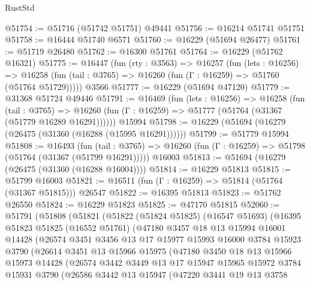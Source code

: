 \begin{lexlean}{RustStd}
\begin{coremodule}
@51754 := @51716 (@51742 @51751) @49441
@51756 := @16214 @51741 @51751
@51758 := @16444 @51740 @6571
@51760 := @16229 (@51694 @26477)
@51761 := @51719 @26480
@51762 := @16300 @51761
@51764 := @16229 (@51762 @16321)
@51775 := @16447
    (fun (rty : @3563) =>
    @16257
      (fun (lets : @16256) =>
      @16258 (fun (tail : @3765) => @16260 (fun (Γ : @16259) => @51760 (@51764 @51729)))))
    @3566
@51777 := @16229 (@51694 @47120)
@51779 := @31368 @51724 @49446
@51791 := @16469
    (fun (lets : @16256) =>
    @16258
      (fun (tail : @3765) =>
      @16260 (fun (Γ : @16259) => @51777 (@51764 (@31367 (@51779 @16289 @16291))))))
    @15994
@51798 := @16229 (@51694 (@16279 (@26475 (@31360 (@16288 (@15995 @16291))))))
@51799 := @51779 @15994
@51808 := @16493
    (fun (tail : @3765) => @16260 (fun (Γ : @16259) => @51798 (@51764 (@31367 (@51799 @16291)))))
    @16003
@51813 := @51694 (@16279 (@26475 (@31360 (@16288 @16004))))
@51814 := @16229 @51813
@51815 := @51799 @16003
@51821 := @16511 (fun (Γ : @16259) => @51814 (@51764 (@31367 @51815))) @26547
@51822 := @16395 @51813
@51823 := @51762 @26550
@51824 := @16229 @51823
@51825 := @47170 @51815
@52060 := @51791
    (@51808
      (@51821
        (@51822
          (@51824 @51825)
          (@16547 @51693)
          (@16395
            @51823
            @51825
            (@16552 @51761)
            (@47180
              @3457
              @18
              @13
              @15994
              @16001
              @14428
              (@26574
                @3451
                @3456
                @13
                @17
                @15977
                @15993
                @16000
                @3784
                @15923
                @3790
                (@26614
                  @3451
                  @13
                  @15966
                  @15975
                  (@47180
                    @3450
                    @18
                    @13
                    @15966
                    @15973
                    @14428
                    (@26574
                      @3442
                      @3449
                      @13
                      @17
                      @15947
                      @15965
                      @15972
                      @3784
                      @15931
                      @3790
                      (@26586
                        @3442
                        @13
                        @15947
                        (@47220
                          @3441
                          @19
                          @13
                          @3758

\end{coremodule}
\end{lexlean}
